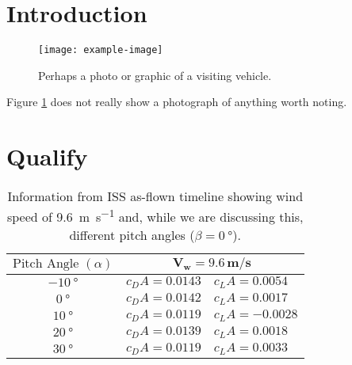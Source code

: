 \documentclass[journal,comsoc]{IEEEtran}
\begin{document}
\renewcommand{\thetable}{\arabic{table}}
\renewcommand \thesection{\arabic{section}} %

\section{Introduction}

\lipsum[2]

\begin{figure}[thb]
	\centering  
	\texttt{[image: example-image]}
	\caption{Perhaps a photo or graphic of a visiting vehicle.}
	\label{fig:graysquare}
\end{figure}

Figure \ref{fig:graysquare} does not really show a photograph of anything worth noting.  \lipsum[1]


\section{Qualify}

\lipsum[1]


\begin{table}
	\centering
	\begin{tabular}{|c|l|l|}
	\hline
	\textbf{$\text{Pitch Angle } (\alpha)$}&\multicolumn{2}{c|}{$\mathbf{V_w=9.6\,m/s}$}\\
	\hline
	$\SI{-10}{\degree}$&$c_DA=0.0143$&$c_LA=0.0054$\\
	\hline
	$\SI{0}{\degree}$&$c_DA=0.0142$&$c_LA=0.0017$\\
	\hline
	$\SI{10}{\degree}$&$c_DA=0.0119$&$c_LA=-0.0028$\\
	\hline
	$\SI{20}{\degree}$&$c_DA=0.0139$&$c_LA=0.0018$\\
	\hline
	$\SI{30}{\degree}$&$c_DA=0.0119$&$c_LA=0.0033$\\
	\hline
	\end{tabular}
	\caption{Information from ISS as-flown timeline showing wind speed of \SI{9.6}{\meter\per\second} and, while we are discussing this, different pitch angles ($\beta=\SI{0}{\degree}$).}
	\label{table:draglift1}
\end{table}
\end{document}
